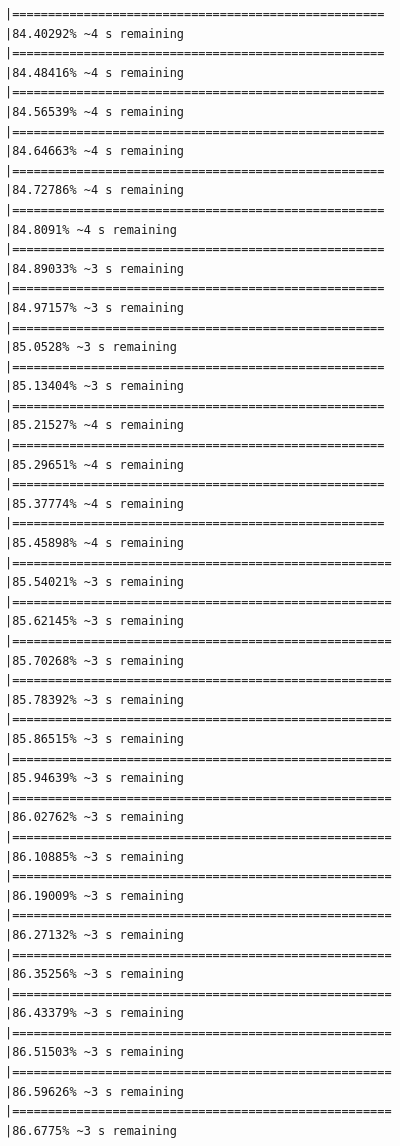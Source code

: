 \documentclass{article}\usepackage[]{graphicx}\usepackage[]{xcolor}
\makeatletter
\newenvironment{kframe}{%
 \def\at@end@of@kframe{}%
 \ifinner\ifhmode%
  \def\at@end@of@kframe{\end{minipage}}%
  \begin{minipage}{\columnwidth}%
 \fi\fi%
 \def\FrameCommand##1{\hskip\@totalleftmargin \hskip-\fboxsep
 \colorbox{shadecolor}{##1}\hskip-\fboxsep
     \hskip-\linewidth \hskip-\@totalleftmargin \hskip\columnwidth}%
 \MakeFramed {\advance\hsize-\width
   \@totalleftmargin\z@ \linewidth\hsize
   \@setminipage}}%
 {\par\unskip\endMakeFramed%
 \at@end@of@kframe}
\newenvironment{knitrout}{}{} %
\makeatother
\begin{document}
\begin{knitrout}
\begin{kframe}
\begin{verbatim}
|====================================================          |84.40292% ~4 s remaining  
|====================================================          |84.48416% ~4 s remaining  
|====================================================          |84.56539% ~4 s remaining  
|====================================================          |84.64663% ~4 s remaining  
|====================================================          |84.72786% ~4 s remaining  
|====================================================          |84.8091% ~4 s remaining   
|====================================================          |84.89033% ~3 s remaining  
|====================================================          |84.97157% ~3 s remaining  
|====================================================          |85.0528% ~3 s remaining   
|====================================================          |85.13404% ~3 s remaining  
|====================================================          |85.21527% ~4 s remaining  
|====================================================          |85.29651% ~4 s remaining  
|====================================================          |85.37774% ~4 s remaining  
|====================================================          |85.45898% ~4 s remaining  
|=====================================================         |85.54021% ~3 s remaining  
|=====================================================         |85.62145% ~3 s remaining  
|=====================================================         |85.70268% ~3 s remaining  
|=====================================================         |85.78392% ~3 s remaining  
|=====================================================         |85.86515% ~3 s remaining  
|=====================================================         |85.94639% ~3 s remaining  
|=====================================================         |86.02762% ~3 s remaining  
|=====================================================         |86.10885% ~3 s remaining  
|=====================================================         |86.19009% ~3 s remaining  
|=====================================================         |86.27132% ~3 s remaining  
|=====================================================         |86.35256% ~3 s remaining  
|=====================================================         |86.43379% ~3 s remaining  
|=====================================================         |86.51503% ~3 s remaining  
|=====================================================         |86.59626% ~3 s remaining  
|=====================================================         |86.6775% ~3 s remaining   

\end{verbatim}
\end{kframe}
\end{knitrout}
\end{document}

